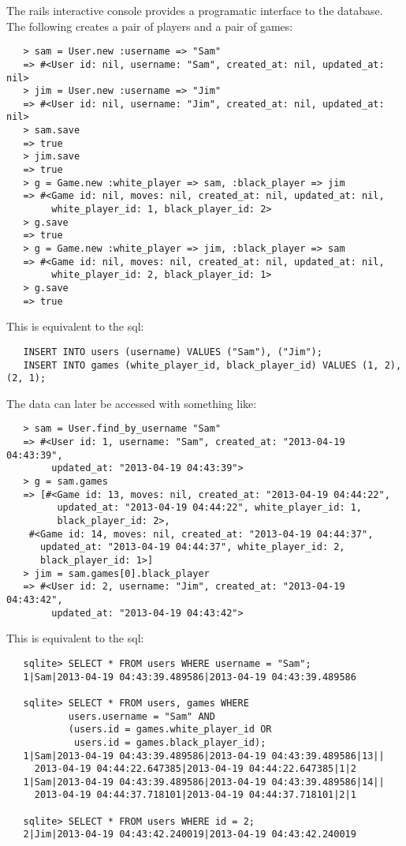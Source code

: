 \documentclass[11pt]{article}
\begin{document}
  The rails interactive console provides a programatic interface to
  the database.  The following creates a pair of players and a pair of
  games:
  
\begin{verbatim}
   > sam = User.new :username => "Sam"
   => #<User id: nil, username: "Sam", created_at: nil, updated_at: nil>
   > jim = User.new :username => "Jim"
   => #<User id: nil, username: "Jim", created_at: nil, updated_at: nil>
   > sam.save
   => true
   > jim.save
   => true
   > g = Game.new :white_player => sam, :black_player => jim
   => #<Game id: nil, moves: nil, created_at: nil, updated_at: nil,
        white_player_id: 1, black_player_id: 2>
   > g.save
   => true
   > g = Game.new :white_player => jim, :black_player => sam
   => #<Game id: nil, moves: nil, created_at: nil, updated_at: nil,
        white_player_id: 2, black_player_id: 1>
   > g.save
   => true
\end{verbatim}


  This is equivalent to the sql:
  
\begin{verbatim}
   INSERT INTO users (username) VALUES ("Sam"), ("Jim");
   INSERT INTO games (white_player_id, black_player_id) VALUES (1, 2), (2, 1);
\end{verbatim}

  
  The data can later be accessed with something like:
  
\begin{verbatim}
   > sam = User.find_by_username "Sam"
   => #<User id: 1, username: "Sam", created_at: "2013-04-19 04:43:39",
        updated_at: "2013-04-19 04:43:39">
   > g = sam.games
   => [#<Game id: 13, moves: nil, created_at: "2013-04-19 04:44:22",
         updated_at: "2013-04-19 04:44:22", white_player_id: 1,
         black_player_id: 2>,
    #<Game id: 14, moves: nil, created_at: "2013-04-19 04:44:37",
      updated_at: "2013-04-19 04:44:37", white_player_id: 2,
      black_player_id: 1>]
   > jim = sam.games[0].black_player
   => #<User id: 2, username: "Jim", created_at: "2013-04-19 04:43:42",
        updated_at: "2013-04-19 04:43:42">
\end{verbatim}

  
  This is equivalent to the sql:
  
\begin{verbatim}
   sqlite> SELECT * FROM users WHERE username = "Sam";
   1|Sam|2013-04-19 04:43:39.489586|2013-04-19 04:43:39.489586
   
   sqlite> SELECT * FROM users, games WHERE
           users.username = "Sam" AND
           (users.id = games.white_player_id OR
            users.id = games.black_player_id);
   1|Sam|2013-04-19 04:43:39.489586|2013-04-19 04:43:39.489586|13||
     2013-04-19 04:44:22.647385|2013-04-19 04:44:22.647385|1|2
   1|Sam|2013-04-19 04:43:39.489586|2013-04-19 04:43:39.489586|14||
     2013-04-19 04:44:37.718101|2013-04-19 04:44:37.718101|2|1
   
   sqlite> SELECT * FROM users WHERE id = 2;
   2|Jim|2013-04-19 04:43:42.240019|2013-04-19 04:43:42.240019
\end{verbatim}
\end{document}
